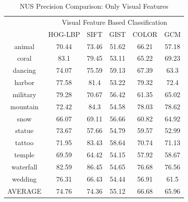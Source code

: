 \begin{table}
\centering
\caption{ NUS Precision Comparison: Only Visual Features} %
\vspace*{0.2 cm}
\begin{tabular}{| c | c | c | c | c | c |}
\hline
 {\multirow{2}{*}{Labels}} & \multicolumn{5}{|c|}{Visual Feature Based Classification} \\ 
 \cline{2-6}
  & HOG-LBP & SIFT & GIST & COLOR & GCM \\  [1ex] \hline
animal & 70.44 & 73.46 & 51.62 & 66.21 & 57.18 \\  [1ex] \hline
coral & 83.1 & 79.45 & 53.11 & 65.22 & 69.23 \\  [1ex] \hline
dancing & 74.07 & 75.59 & 59.13 & 67.39 & 63.3 \\  [1ex] \hline
harbor & 77.58 & 81.4 & 53.22 & 79.32 & 72.4 \\  [1ex] \hline
military & 79.28 & 70.67 & 56.42 & 61.35 & 65.02 \\  [1ex] \hline
mountain & 72.42 & 84.3 & 54.58 & 78.03 & 78.62 \\  [1ex] \hline
snow & 66.07 & 69.11 & 56.66 & 60.82 & 64.92 \\  [1ex] \hline
statue & 73.67 & 57.66 & 54.79 & 59.57 & 52.99 \\  [1ex] \hline
tattoo & 71.95 & 83.43 & 58.64 & 70.74 & 71.13 \\  [1ex] \hline
temple & 69.59 & 64.42 & 54.15 & 57.92 & 58.67 \\  [1ex] \hline
waterfall & 82.59 & 86.45 & 54.65 & 76.68 & 76.56 \\  [1ex] \hline
wedding & 76.31 & 66.43 & 54.44 & 56.91 & 61.5 \\  [1ex] \hline
AVERAGE & 74.76 & 74.36 & 55.12 & 66.68 & 65.96 \\  [1ex] \hline
\end{tabular}
\label{NUSPrecisionVisual} %
\end{table}

